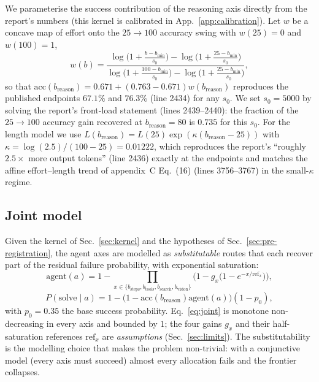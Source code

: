 \documentclass[10pt]{article} %
\newcommand{\eff}{b}
\newcommand{\reff}{\eff_{\mathrm{reason}}}
\newcommand{\stepeff}{\eff_{\mathrm{steps}}}
\newcommand{\tooleff}{\eff_{\mathrm{tools}}}
\newcommand{\searcheff}{\eff_{\mathrm{search}}}
\newcommand{\viseff}{\eff_{\mathrm{vision}}}
\begin{document}
We parameterise the success contribution of the reasoning axis directly from the
report's numbers (this kernel is calibrated in App.~\ref{app:calibration}). Let $w$ be a concave map of effort onto the $25 \to 100$
accuracy swing with $w(25)=0$ and $w(100)=1$,
\begin{equation}
w(b) = \frac{\log\!\big(1+\tfrac{b-b_{\min}}{s_0}\big) - \log\!\big(1+\tfrac{25-b_{\min}}{s_0}\big)}
             {\log\!\big(1+\tfrac{100-b_{\min}}{s_0}\big) - \log\!\big(1+\tfrac{25-b_{\min}}{s_0}\big)},
\end{equation}
so that
$\mathrm{acc}(\reff) = 0.671 + (0.763-0.671) w(\reff)$ reproduces the published
endpoints $67.1\%$ and $76.3\%$ (line 2434) for any $s_0$. We set $s_0=5000$ by
solving the report's front-load statement (lines 2439--2440): the fraction of the
$25 \to 100$ accuracy gain recovered at $\reff=80$ is $0.735$ for this $s_0$.
For the length model we use $L(\reff) = L(25)\exp(\kappa(\reff-25))$ with
$\kappa = \log(2.5)/(100-25) = 0.01222$, which reproduces the report's
``roughly $2.5\times$ more output tokens'' (line 2436) exactly at the endpoints
and matches the affine effort--length trend of appendix~C Eq.~(16)
(lines 3756--3767) in the small-$\kappa$ regime.

\subsection{Joint model}
\label{sec:model}

Given the kernel of Sec.~\ref{sec:kernel} and the hypotheses of Sec.~\ref{sec:pre-registration}, the agent axes are modelled as \emph{substitutable} routes that each recover part
of the residual failure probability, with exponential saturation:
\begin{equation}
\mathrm{agent}(a) = 1 - \prod_{x \in \{\stepeff,\tooleff,\searcheff,\viseff\}}
   \Big(1 - g_x\big(1 - e^{-x/\mathrm{ref}_x}\big)\Big),
\end{equation}
\begin{equation}
P(\text{solve} \mid a) = 1 - \big(1 - \mathrm{acc}(\reff)\mathrm{agent}(a)\big)(1-p_0),
\label{eq:joint}
\end{equation}
with $p_0 = 0.35$ the base success probability. Eq.~\eqref{eq:joint} is monotone
non-decreasing in every axis and bounded by $1$; the four gains $g_x$ and their
half-saturation references $\mathrm{ref}_x$ are \emph{assumptions}
(Sec.~\ref{sec:limits}). The substitutability is the modelling choice that makes
the problem non-trivial: with a conjunctive model (every axis must succeed)
almost every allocation fails and the frontier collapses.
\end{document}
